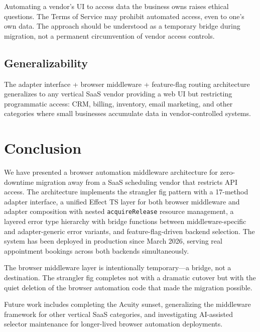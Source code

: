 \documentclass[conference]{IEEEtran}
\begin{document}
Automating a vendor's UI to access data the business owns raises ethical questions. The Terms of Service may prohibit automated access, even to one's own data. The approach should be understood as a temporary bridge during migration, not a permanent circumvention of vendor access controls.

\subsection{Generalizability}

The adapter interface + browser middleware + feature-flag routing architecture generalizes to any vertical SaaS vendor providing a web UI but restricting programmatic access: CRM, billing, inventory, email marketing, and other categories where small businesses accumulate data in vendor-controlled systems.

\section{Conclusion}

We have presented a browser automation middleware architecture for zero-downtime migration away from a SaaS scheduling vendor that restricts API access. The architecture implements the strangler fig pattern with a 17-method adapter interface, a unified Effect TS layer for both browser middleware and adapter composition with nested \texttt{acquireRelease} resource management, a layered error type hierarchy with bridge functions between middleware-specific and adapter-generic error variants, and feature-flag-driven backend selection. The system has been deployed in production since March 2026, serving real appointment bookings across both backends simultaneously.

The browser middleware layer is intentionally temporary---a bridge, not a destination. The strangler fig completes not with a dramatic cutover but with the quiet deletion of the browser automation code that made the migration possible.

Future work includes completing the Acuity sunset, generalizing the middleware framework for other vertical SaaS categories, and investigating AI-assisted selector maintenance for longer-lived browser automation deployments.

\balance


\end{document}
